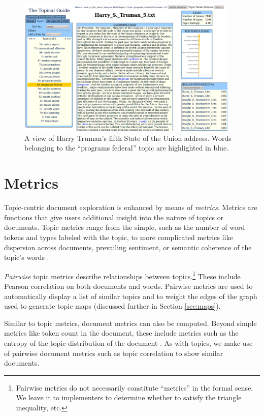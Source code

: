 \documentclass[11pt]{article}
\begin{document}
\begin{figure}[t]
 \centering
 \includegraphics[width=400px,keepaspectratio=true]{./topic_document_view2.png}
 \caption{A view of Harry Truman's fifth State of the Union address. Words belonging to the ``programs federal'' topic are highlighted in blue.}
 \label{fig:topic_doc}
\end{figure}

\section{Metrics}
Topic-centric document exploration is enhanced by means of \textit{metrics}.
Metrics are functions that give users additional insight into the nature of
topics or documents. Topic metrics range from the simple, such as the number of word tokens and types labeled with the
topic, to more complicated metrics like dispersion across documents,
prevailing sentiment, or semantic coherence of the topic's words \cite{Newman2010Coherence}.

\textit{Pairwise} topic metrics describe relationships between
topics.\footnote{Pairwise metrics do not necessarily constitute
``metrics'' in the formal sense. We leave it to implementers to determine
whether to satisfy the triangle inequality, etc.} These include Pearson correlation on both documents and words.
Pairwise metrics are used to automatically display a list of similar topics and to weight
the edges of the graph used to generate topic maps (discussed further in Section
\ref{sec:maps}).

Similar to topic metrics, document metrics can also be computed.
Beyond simple metrics like token count in the document, these include
metrics such as the entropy of the topic distribution of the document \cite{Misra2008}. As %
with topics, we make use of pairwise document metrics such as topic
correlation \cite{Blei2009} to show similar documents.
\end{document}
